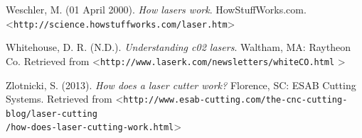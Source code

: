 \documentclass[12pt singlecol]{article}
\begin{document}
\begin{flushleft}
\begin{thebibliography}{99\kern\bibindent}
	 Weschler, M. (01 April 2000). \emph{How lasers work}. HowStuffWorks.com. \textless\texttt{http://science.howstuffworks.com/laser.htm}\textgreater

	 Whitehouse, D. R. (N.D.). \emph{Understanding c02 lasers}. Waltham, MA: Raytheon Co. Retrieved from \textless\texttt{http://www.laserk.com/newsletters/whiteCO.html} \textgreater

	 Zlotnicki, S. (2013). \emph{How does a laser cutter work?} Florence, SC: ESAB Cutting Systems. Retrieved from \textless\texttt{http://www.esab-cutting.com/the-cnc-cutting-blog/laser-cutting\\/how-does-laser-cutting-work.html}\textgreater

\end{thebibliography}

\end{flushleft}
\end{document}
